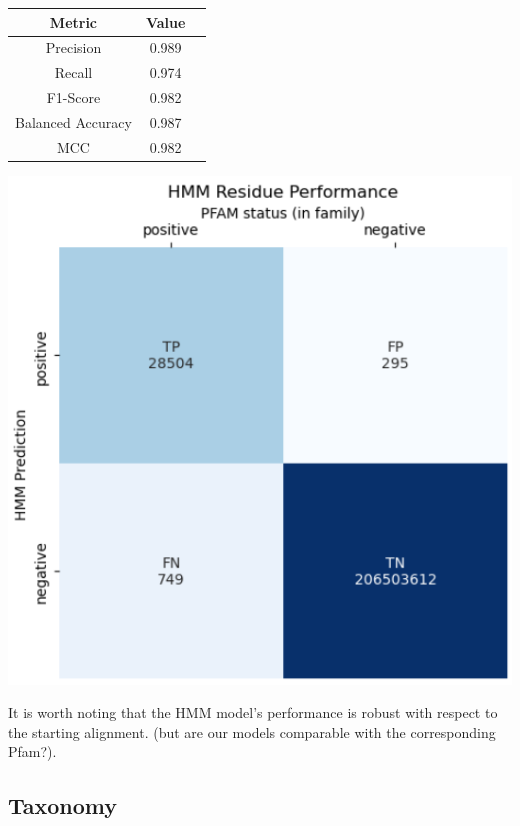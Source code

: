 \documentclass[10pt,twocolumn,letterpaper]{article}
\begin{document}
\begin{center}
    \begin{tabular}{ccc}
        \toprule
        Metric & Value \\
        \midrule
        Precision & 0.989 \\
        Recall & 0.974 \\
        F1-Score & 0.982 \\
        Balanced Accuracy & 0.987 \\
        MCC & 0.982 \\
        \bottomrule
    \end{tabular}
\end{center} 

\begin{center}
    \includegraphics[scale=0.45]{report/img/hmm_res_performance.png}
\end{center}

It is worth noting that the HMM model's performance is robust with respect to the starting alignment. (but are our models comparable with the corresponding Pfam?).\\

\subsection{Taxonomy}
\end{document}
